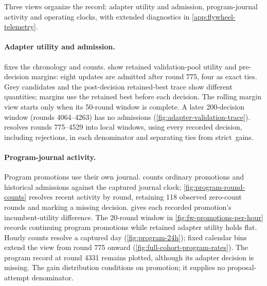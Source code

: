 
Three views organize the record: adapter utility and admission,
program-journal activity and operating clocks, with extended diagnostics
in \cref{app:flywheel-telemetry}.

\paragraph{Adapter utility and admission.}
 fixes the chronology and counts.
 show retained
validation-pool utility and pre-decision margins: eight updates are
admitted after round 775, four as exact ties. Grey candidates and the
post-decision retained-best trace show different quantities; margins use
the retained best before each decision. The rolling margin view starts
only when its 50-round window is complete. A later 200-decision window
(rounds 4064--4263) has no admissions (\cref{fig:adapter-validation-trace}).
 resolves rounds 775--4529 into local
windows, using every recorded decision, including rejections, in each
denominator and separating ties from strict~gains.

\paragraph{Program-journal activity.}
Program promotions use their own journal. 
counts ordinary promotions and historical admissions against the captured
journal clock; \cref{fig:program-round-counts} resolves recent activity by
round, retaining 118 observed zero-count rounds and marking a missing decision.
 gives each recorded promotion's
incumbent-utility difference. The 20-round window in
\cref{fig:fw-promotions-per-hour} records continuing program promotions
while retained adapter utility holds flat. Hourly counts resolve a captured
day (\cref{fig:program-24h}); fixed calendar bins extend the view from
round 775 onward (\cref{fig:full-cohort-program-rates}). The program record at
round 4331 remains plotted, although its adapter decision is missing.
The gain distribution conditions on promotion; it supplies no
proposal-attempt denominator.

